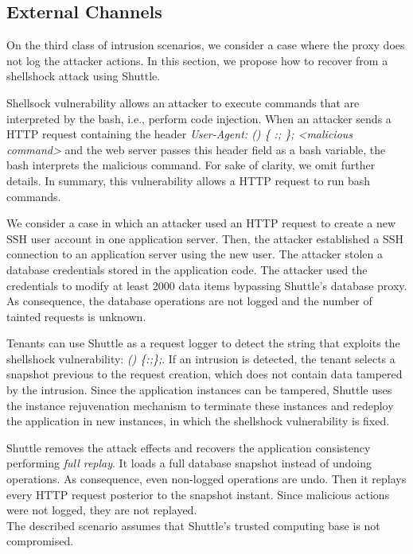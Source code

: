\subsection{External Channels}\label{sec:eval:accuracy:external}
On the third class of intrusion scenarios, we consider a case where the proxy does not log the attacker actions. In this section, we propose how to recover from a shellshock attack using Shuttle.

Shellsock vulnerability allows an attacker to execute commands that are interpreted by the bash, i.e., perform code injection. When an attacker sends a \ac{HTTP} request containing the header \emph{User-Agent: () \{ :; \}; <malicious command>} and the web server passes this header field as a bash variable, the bash interprets the malicious command. For sake of clarity, we omit further details. In summary, this vulnerability allows a \ac{HTTP} request to run bash commands.

We consider a case in which an attacker used an \ac{HTTP} request to create a new \ac{SSH} user account in one application server. Then, the attacker established a \ac{SSH} connection to an application server using the new user. The attacker stolen a database credentials stored in the application code. The attacker used the credentials to modify at least 2000 data items bypassing Shuttle's database proxy. As consequence, the database operations are not logged and the number of tainted requests is unknown.

Tenants can use Shuttle as a request logger to detect the string that exploits the shellshock vulnerability: \emph{() \{:;\};}. If an intrusion is detected, the tenant selects a snapshot previous to the request creation, which does not contain data tampered by the intrusion. Since the application instances can be tampered, Shuttle uses the instance rejuvenation mechanism to terminate these instances and redeploy the application in new instances, in which the shellshock vulnerability is fixed.

Shuttle removes the attack effects and recovers the application consistency performing \emph{full replay}. It loads a full database snapshot instead of undoing operations. As consequence, even non-logged operations are undo. Then it replays every HTTP request posterior to the snapshot instant. Since malicious actions were not logged, they are not replayed.\\

The described scenario assumes that Shuttle's trusted computing base is not compromised.

